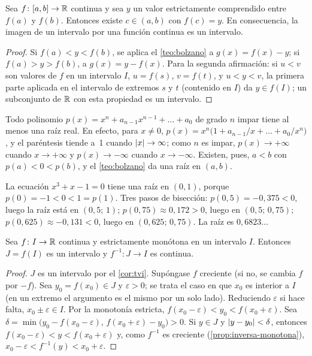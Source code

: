 \begin{corolario}\label{cor:tvi}
Sea $f\colon[a,b]\to\mathbb{R}$ continua y sea $y$ un valor estrictamente comprendido entre $f(a)$ y $f(b)$. Entonces existe $c\in(a,b)$ con $f(c)=y$. En consecuencia, la imagen de un intervalo por una función continua es un intervalo.
\end{corolario}

\begin{proof}
Si $f(a)<y<f(b)$, se aplica el \cref{teo:bolzano} a $g(x)=f(x)-y$; si $f(a)>y>f(b)$, a $g(x)=y-f(x)$. Para la segunda afirmación: si $u<v$ son valores de $f$ en un intervalo $I$, $u=f(s)$, $v=f(t)$, y $u<y<v$, la primera parte aplicada en el intervalo de extremos $s$ y $t$ (contenido en $I$) da $y\in f(I)$; un subconjunto de $\mathbb{R}$ con esta propiedad es un intervalo.
\end{proof}

\begin{ejemplo}\label{ej:grado-impar}
Todo polinomio $p(x)=x^{n}+a_{n-1}x^{n-1}+\dots+a_0$ de grado $n$ impar tiene al menos una raíz real. En efecto, para $x\ne0$, $p(x)=x^{n}\bigl(1+a_{n-1}/x+\dots+a_0/x^{n}\bigr)$, y el paréntesis tiende a~1 cuando $\lvert x\rvert\to\infty$; como $n$ es impar, $p(x)\to+\infty$ cuando $x\to+\infty$ y $p(x)\to-\infty$ cuando $x\to-\infty$. Existen, pues, $a<b$ con $p(a)<0<p(b)$, y el \cref{teo:bolzano} da una raíz en $(a,b)$.
\end{ejemplo}

\begin{ejemplo}[Bisección]\label{ej:biseccion}
La ecuación $x^{3}+x-1=0$ tiene una raíz en $(0,1)$, porque $p(0)=-1<0<1=p(1)$. Tres pasos de bisección: $p(0{,}5)=-0{,}375<0$, luego la raíz está en $(0{,}5;\,1)$; $p(0{,}75)\approx0{,}172>0$, luego en $(0{,}5;\,0{,}75)$; $p(0{,}625)\approx-0{,}131<0$, luego en $(0{,}625;\,0{,}75)$. La raíz es $0{,}6823\dots$
\end{ejemplo}

\begin{teorema}\label{teo:inversa-continua}
Sea $f\colon I\to\mathbb{R}$ continua y estrictamente monótona en un intervalo $I$. Entonces $J=f(I)$ es un intervalo y $f^{-1}\colon J\to I$ es continua.
\end{teorema}

\begin{proof}
$J$ es un intervalo por el \cref{cor:tvi}. Supóngase $f$ creciente (si no, se cambia $f$ por $-f$). Sea $y_0=f(x_0)\in J$ y $\varepsilon>0$; se trata el caso en que $x_0$ es interior a $I$ (en un extremo el argumento es el mismo por un solo lado). Reduciendo $\varepsilon$ si hace falta, $x_0\pm\varepsilon\in I$. Por la monotonía estricta, $f(x_0-\varepsilon)<y_0<f(x_0+\varepsilon)$. Sea $\delta=\min\bigl(y_0-f(x_0-\varepsilon),\,f(x_0+\varepsilon)-y_0\bigr)>0$. Si $y\in J$ y $\lvert y-y_0\rvert<\delta$, entonces $f(x_0-\varepsilon)<y<f(x_0+\varepsilon)$ y, como $f^{-1}$ es creciente (\cref{prop:inversa-monotona}), $x_0-\varepsilon<f^{-1}(y)<x_0+\varepsilon$.
\end{proof}

